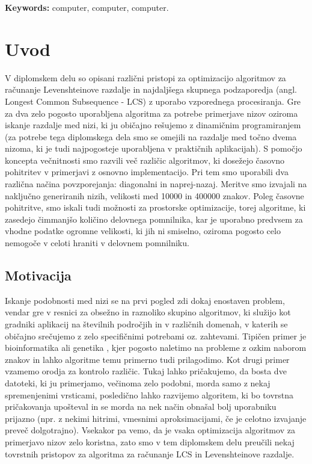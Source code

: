 \documentclass[a4paper,12pt,openright]{book}
\newcommand{\tkeywordsEn}{computer, computer, computer}
\newcommand{\clearemptydoublepage}{\newpage{\pagestyle{empty}\cleardoublepage}}
\begin{document}
\bigskip

\noindent\textbf{Keywords:} \tkeywordsEn.
\clearemptydoublepage

\mainmatter
\setcounter{page}{1}
\pagestyle{fancy}

\chapter{Uvod}

V diplomskem delu so opisani različni pristopi za optimizacijo algoritmov za računanje Levenshteinove razdalje in najdaljšega skupnega podzaporedja (angl. Longest Common Subsequence - LCS) z uporabo vzporednega procesiranja. Gre za dva zelo pogosto uporabljena algoritma za potrebe primerjave nizov oziroma iskanje razdalje med nizi, ki ju običajno rešujemo z dinamičnim programiranjem (za potrebe tega diplomskega dela smo se omejili na razdalje med točno dvema nizoma, ki je tudi najpogosteje uporabljena v praktičnih aplikacijah). S pomočjo koncepta večnitnosti smo razvili več različic algoritmov, ki dosežejo časovno pohitritev v primerjavi z osnovno implementacijo. Pri tem smo uporabili dva različna načina povzporejanja: diagonalni in naprej-nazaj. Meritve smo izvajali na naključno generiranih nizih, velikosti med 10000 in 400000 znakov. Poleg časovne pohitritve, smo iskali tudi možnosti za prostorske optimizacije, torej algoritme, ki zasedejo čimmanjšo količino delovnega pomnilnika, kar je uporabno predvsem za vhodne podatke ogromne velikosti, ki jih ni smiselno, oziroma pogosto celo nemogoče v celoti hraniti v delovnem pomnilniku. 

\section{Motivacija}

Iskanje podobnosti med nizi se na prvi pogled zdi dokaj enostaven problem, vendar gre v resnici za obsežno in raznoliko skupino algoritmov, ki služijo kot gradniki aplikacij na številnih področjih in v različnih domenah, v katerih se običajno srečujemo z zelo specifičnimi potrebami oz. zahtevami. Tipičen primer je bioinformatika ali genetika \cite{LCSpracticalUse}, kjer pogosto naletimo na probleme z ozkim naborom znakov in lahko algoritme temu primerno tudi prilagodimo. Kot drugi primer vzamemo orodja za kontrolo različic. Tukaj lahko pričakujemo, da bosta dve datoteki, ki ju primerjamo, večinoma zelo podobni, morda samo z nekaj spremenjenimi vrsticami, posledično lahko razvijemo algoritem, ki bo tovrstna pričakovanja upošteval in se morda na nek način obnašal bolj uporabniku prijazno (npr. z nekimi hitrimi, vmesnimi aproksimacijami, če je celotno izvajanje preveč dolgotrajno). Vsekakor pa vemo, da je vsaka optimizacija algoritmov za primerjavo nizov zelo koristna, zato smo v tem diplomskem delu preučili nekaj tovrstnih pristopov za algoritma za računanje LCS in Levenshteinove razdalje. 
\end{document}
